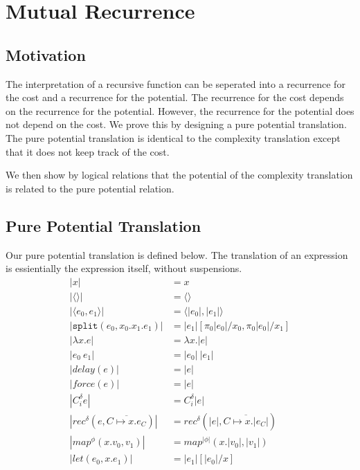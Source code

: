 \chapter{Mutual Recurrence}

\section{Motivation}
The interpretation of a recursive function can be seperated into a recurrence for 
the cost and a recurrence for the potential. The recurrence for the cost depends on
the recurrence for the potential. However, the recurrence for the potential does not 
depend on the cost. We prove this by designing a pure potential translation. The pure
potential translation is identical to the complexity translation except that it does not
keep track of the cost.

We then show by logical relations that the potential of the complexity translation is
related to the pure potential relation.

\section{Pure Potential Translation}
Our pure potential translation is defined below. The translation of an expression is
essientially the expression itself, without suspensions.
\begin{align*}
  |x| &= x                                                                                     \\
  |\langle\rangle| &= \langle\rangle                                                           \\
  |\langle e_0, e_1 \rangle | &= \langle |e_0|, |e_1| \rangle                                  \\
  |\texttt{split}(e_0, x_0. x_1. e_1)| &= |e_1|[\pi_0|e_0|/x_0, \pi_0|e_0|/x_1]                \\
  |\lambda x.e | &= \lambda x.|e|                                                              \\
  |e_0\ e_1| &= |e_0|\ |e_1|                                                                   \\
  |delay(e)| &= |e|                                                                            \\
  |force(e)| &= |e|                                                                            \\
  |C_i^\delta e| &= C_i^\delta |e|                                                             \\
  |rec^\delta(e, \overline{C \mapsto x.e_C})| &= rec^\delta(|e|, \overline{C \mapsto x.|e_C|}) \\
  |map^\phi(x.v_0, v_1)| &= map^{|\phi|}(x.|v_0|, |v_1|)                                       \\
  |let(e_0, x.e_1)| &= |e_1|[|e_0|/x]
\end{align*}

